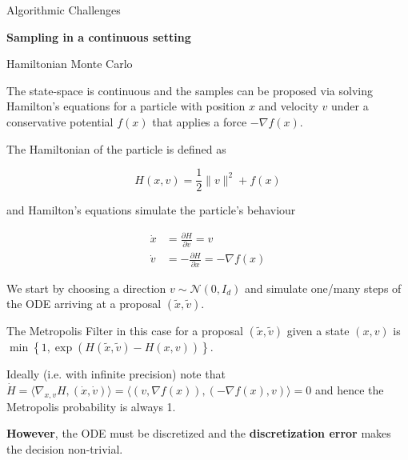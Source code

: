 \documentclass[10pt]{beamer}
\begin{document}
\begin{frame}[allowframebreaks]{Algorithmic Challenges}
    



    
\end{frame}

\begin{frame}
    \vfill 
    \centering
    \Large
    \textbf{Sampling in a continuous setting}
    \vfill
\end{frame}


\begin{frame}[allowframebreaks]{Hamiltonian Monte Carlo}
    
    The state-space is continuous and the samples can be proposed via solving Hamilton's equations for a particle with position $x$ and velocity $v$ under a conservative potential $f(x)$ that applies a force $-\nabla f(x)$. \cite{duane1987hybrid}
    
    The Hamiltonian of the particle is defined as 
    
    \begin{equation*}
        H(x, v) = \frac 1 2 \| v \|^2 + f(x)
    \end{equation*}
    
    and Hamilton's equations simulate the particle's behaviour
    
    \begin{align*}
        \dot x & = \frac {\partial H} {\partial v} =  v \\
        \dot v & = - \frac {\partial H} {\partial x} =  - \nabla f(x)
    \end{align*}
    
    \framebreak
    
    We start by choosing a direction $v \sim \mathcal N(0, I_d)$ and simulate one/many steps of the ODE arriving at a proposal $(\tilde x, \tilde v)$. 
    
    \medskip
    
    The Metropolis Filter in this case for a proposal $(\tilde x, \tilde v)$ given a state $(x, v)$ is $\min \left \{ 1, \exp( H(\tilde x, \tilde v) - H(x, v) ) \right \}$.
    
    \medskip
    
    Ideally (i.e. with infinite precision) note that $\dot H = \langle \nabla_{x, v} H, (\dot x, \dot v) \rangle = \langle (v, \nabla f(x)), (- \nabla f(x), v) \rangle = 0$ and hence the Metropolis probability is always 1. 
    
    \medskip
    
    \textbf{However}, the ODE must be discretized and the \textbf{discretization error} makes the decision non-trivial. 
    

\end{frame}
\end{document}
